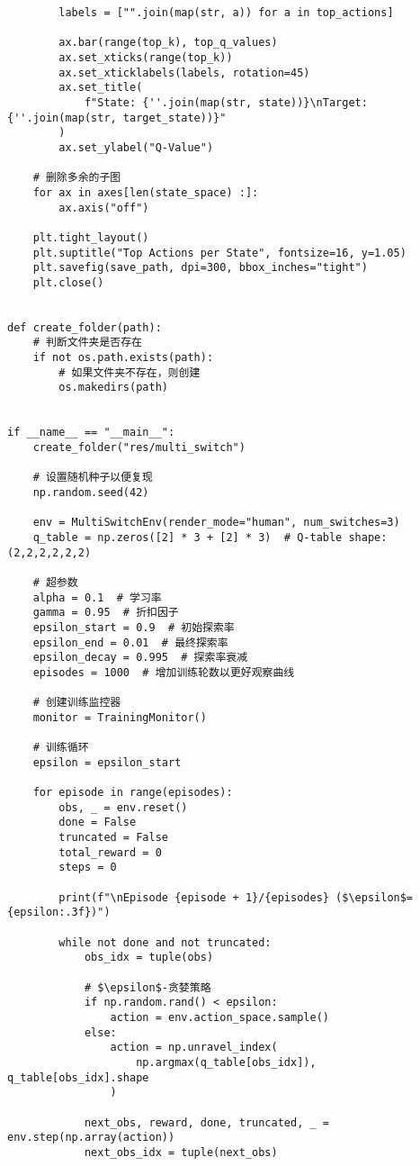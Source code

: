 \begin{verbatim}
        labels = ["".join(map(str, a)) for a in top_actions]

        ax.bar(range(top_k), top_q_values)
        ax.set_xticks(range(top_k))
        ax.set_xticklabels(labels, rotation=45)
        ax.set_title(
            f"State: {''.join(map(str, state))}\nTarget: {''.join(map(str, target_state))}"
        )
        ax.set_ylabel("Q-Value")

    # 删除多余的子图
    for ax in axes[len(state_space) :]:
        ax.axis("off")

    plt.tight_layout()
    plt.suptitle("Top Actions per State", fontsize=16, y=1.05)
    plt.savefig(save_path, dpi=300, bbox_inches="tight")
    plt.close()


def create_folder(path):
    # 判断文件夹是否存在
    if not os.path.exists(path):
        # 如果文件夹不存在，则创建
        os.makedirs(path)


if __name__ == "__main__":
    create_folder("res/multi_switch")

    # 设置随机种子以便复现
    np.random.seed(42)

    env = MultiSwitchEnv(render_mode="human", num_switches=3)
    q_table = np.zeros([2] * 3 + [2] * 3)  # Q-table shape: (2,2,2,2,2,2)

    # 超参数
    alpha = 0.1  # 学习率
    gamma = 0.95  # 折扣因子
    epsilon_start = 0.9  # 初始探索率
    epsilon_end = 0.01  # 最终探索率
    epsilon_decay = 0.995  # 探索率衰减
    episodes = 1000  # 增加训练轮数以更好观察曲线

    # 创建训练监控器
    monitor = TrainingMonitor()

    # 训练循环
    epsilon = epsilon_start

    for episode in range(episodes):
        obs, _ = env.reset()
        done = False
        truncated = False
        total_reward = 0
        steps = 0

        print(f"\nEpisode {episode + 1}/{episodes} ($\epsilon$={epsilon:.3f})")

        while not done and not truncated:
            obs_idx = tuple(obs)

            # $\epsilon$-贪婪策略
            if np.random.rand() < epsilon:
                action = env.action_space.sample()
            else:
                action = np.unravel_index(
                    np.argmax(q_table[obs_idx]), q_table[obs_idx].shape
                )

            next_obs, reward, done, truncated, _ = env.step(np.array(action))
            next_obs_idx = tuple(next_obs)


\end{verbatim}
